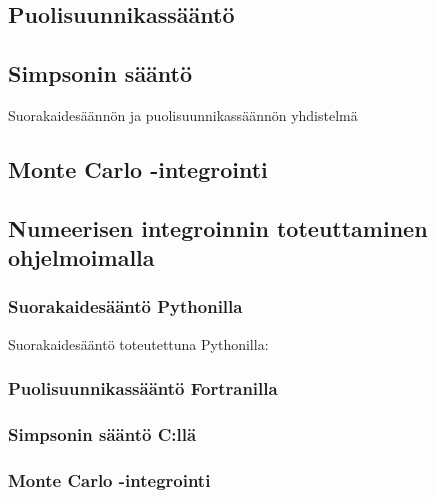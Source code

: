 \documentclass[../integrointiopas.tex]{subfiles}
\begin{document}
	
	\subsection{Puolisuunnikassääntö}
	
	\subsection{Simpsonin sääntö}
	
	Suorakaidesäännön ja puolisuunnikassäännön yhdistelmä
	
	\subsection{Monte Carlo -integrointi}
	
	\subsection{Numeerisen integroinnin toteuttaminen ohjelmoimalla}

    \subsubsection{Suorakaidesääntö Pythonilla}

    Suorakaidesääntö toteutettuna Pythonilla:

    \lstset{style=python-style}
    

    \subsubsection{Puolisuunnikassääntö Fortranilla}

    \subsubsection{Simpsonin sääntö C:llä}

    \subsubsection{Monte Carlo -integrointi }
\end{document}
